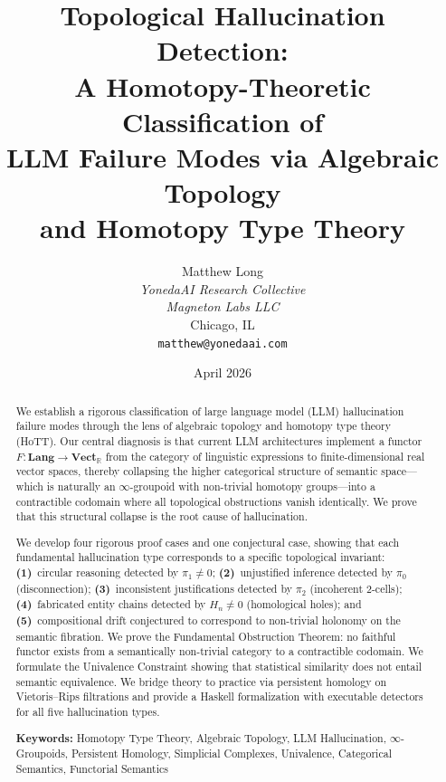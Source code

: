 \documentclass[11pt,a4paper]{article}
\title{%
  \textbf{Topological Hallucination Detection:}\\[4pt]
  \large A Homotopy-Theoretic Classification of\\
  LLM Failure Modes via Algebraic Topology\\
  and Homotopy Type Theory%
}
\author{%
  Matthew Long \\
  \textit{YonedaAI Research Collective} \\
  \textit{Magneton Labs LLC} \\
  Chicago, IL \\
  \texttt{matthew@yonedaai.com}%
}
\date{April 2026}
\theoremstyle{plain}
\theoremstyle{definition}
\theoremstyle{remark}
\newcommand{\Lang}{\mathbf{Lang}}
\newcommand{\Vect}{\mathbf{Vect}}
\newcommand{\R}{\mathbb{R}}
\begin{document}

\maketitle

\begin{abstract}
We establish a rigorous classification of large language model (LLM) hallucination failure modes through the lens of algebraic topology and homotopy type theory (HoTT). Our central diagnosis is that current LLM architectures implement a functor $F: \Lang \to \Vect_{\R}$ from the category of linguistic expressions to finite-dimensional real vector spaces, thereby collapsing the higher categorical structure of semantic space---which is naturally an $\infty$-groupoid with non-trivial homotopy groups---into a contractible codomain where all topological obstructions vanish identically. We prove that this structural collapse is the root cause of hallucination.

We develop four rigorous proof cases and one conjectural case, showing that each fundamental hallucination type corresponds to a specific topological invariant: \textbf{(1)}~circular reasoning detected by $\pi_1 \neq 0$; \textbf{(2)}~unjustified inference detected by $\pi_0$ (disconnection); \textbf{(3)}~inconsistent justifications detected by $\pi_2$ (incoherent 2-cells); \textbf{(4)}~fabricated entity chains detected by $H_n \neq 0$ (homological holes); and \textbf{(5)}~compositional drift conjectured to correspond to non-trivial holonomy on the semantic fibration. We prove the Fundamental Obstruction Theorem: no faithful functor exists from a semantically non-trivial category to a contractible codomain. We formulate the Univalence Constraint showing that statistical similarity does not entail semantic equivalence. We bridge theory to practice via persistent homology on Vietoris--Rips filtrations and provide a Haskell formalization with executable detectors for all five hallucination types.

\medskip\noindent\textbf{Keywords:} Homotopy Type Theory, Algebraic Topology, LLM Hallucination, $\infty$-Groupoids, Persistent Homology, Simplicial Complexes, Univalence, Categorical Semantics, Functorial Semantics
\end{abstract}
\end{document}
